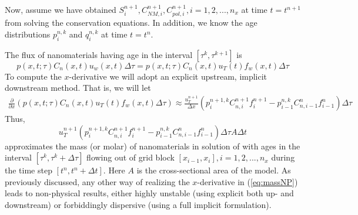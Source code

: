 \documentclass[energies,article,submit,moreauthors,pdftex]{Definitions/mdpi}
\begin{document}
Now, assume we have obtained $S^{n+1}_{i}, C^{n+1}_{\textit{NM}, i}, C^{n+1}_{pol, i}, i=1,2,...,n_x$ at time $t=t^{n+1}$ from solving the conservation equations. In addition, we know the age distributions $p^{n,k}_i$ and $q^{n,k}_i$ at time $t=t^{n}$.

The flux of nanomaterials having age in the interval $\left[\tau^k, \tau^{k+1}\right]$ is
\begin{equation}
    p(x,t;\tau)C_n(x,t)u_w(x,t)\Delta\tau = p(x,t;\tau)C_n(x,t)u_T(t)f_w(x,t)\Delta\tau
\end{equation}
To compute the  $x$-derivative we will adopt an explicit upstream, implicit downstream method. That is, we will let
\begin{multline}
    \frac{\partial}{\partial x} \left(p(x,t;\tau)C_n(x,t)u_T(t)f_w(x,t)\Delta\tau\right) \approx \frac{u_T^{n+1}}{\Delta x} \left(p_i^{n+1,k}C_{n,i}^{n+1}f_i^{n+1}- p_{i-1}^{n,k}C_{n,i-1}^{n}f_{i-1}^{n}\right)\Delta\tau
\end{multline}
Thus,
\begin{equation} \label{eq:massNP} %
    u_T^{n+1} \left(p_i^{n+1,k}C_{n,i}^{n+1}f_i^{n+1}- p_{i-1}^{n,k}C_{n,i-1}^{n}f_{i-1}^{n}\right)\Delta\tau A\Delta t
\end{equation}
approximates the mass (or molar) of nanomaterials in solution of with ages in the interval $\left[\tau^k, \tau^k+\Delta\tau\right]$  flowing out of grid block $\left[x_{i-1},x_i\right],i=1,2,...,n_x$ during the time step  $\left[t^n, t^n+\Delta t\right]$. Here $A$ is the cross-sectional area of the model. As previously discussed, any other way of realizing the  $x$-derivative in (\ref{eq:massNP}) leads to non-physical results, either highly unstable (using explicit both up- and downstream) or forbiddingly dispersive (using a full implicit formulation). 
\end{document}
